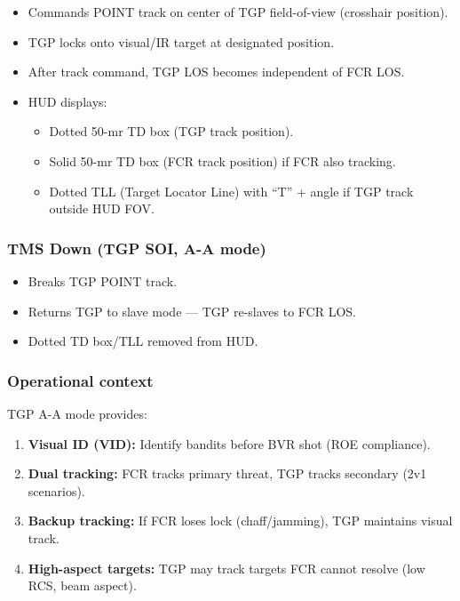 \documentclass[11pt, a4paper, twoside]{report}
\begin{document}
\begin{itemize}[nosep]
    \item Commands POINT track on center of TGP field-of-view (crosshair position).
    \item TGP locks onto visual/IR target at designated position.
    \item After track command, TGP LOS becomes independent of FCR LOS.
    \item HUD displays:
    \begin{itemize}[nosep]
        \item Dotted 50-mr TD box (TGP track position).
        \item Solid 50-mr TD box (FCR track position) if FCR also tracking.
        \item Dotted TLL (Target Locator Line) with ``T'' + angle if TGP track outside HUD FOV.
    \end{itemize}
\end{itemize}

\subsubsection*{TMS Down (TGP SOI, A-A mode)}
\label{sec:C4-S3-S6-S2}

\begin{itemize}[nosep]
    \item Breaks TGP POINT track.
    \item Returns TGP to slave mode --- TGP re-slaves to FCR LOS.
    \item Dotted TD box/TLL removed from HUD.
\end{itemize}

\subsubsection*{Operational context}
\label{sec:C4-S3-S6-S3}

TGP A-A mode provides:
\begin{enumerate}[nosep]
    \item \textbf{Visual ID (VID):} Identify bandits before BVR shot (ROE compliance).
    \item \textbf{Dual tracking:} FCR tracks primary threat, TGP tracks secondary (2v1 scenarios).
    \item \textbf{Backup tracking:} If FCR loses lock (chaff/jamming), TGP maintains visual track.
    \item \textbf{High-aspect targets:} TGP may track targets FCR cannot resolve (low RCS, 
          beam aspect).
\end{enumerate}
\end{document}
